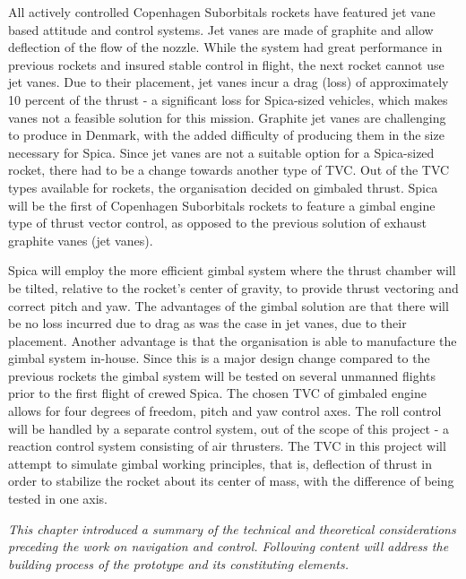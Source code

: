 All actively controlled Copenhagen Suborbitals rockets have featured jet vane based attitude and control systems. Jet vanes are made of graphite and allow deflection of the flow of the nozzle. While the system had great performance in previous rockets and insured stable control in flight, the next rocket cannot use jet vanes.
Due to their placement, jet vanes incur a drag (loss) of approximately 10 percent of the thrust - a significant loss for Spica-sized vehicles, which makes vanes not a feasible solution for this mission.
Graphite jet vanes are challenging to produce in Denmark, with the added difficulty of producing them in the size necessary for Spica.
Since jet vanes are not a suitable option for a Spica-sized rocket, there had to be a change towards another type of TVC. Out of the TVC types available for rockets, the organisation decided on gimbaled thrust.
Spica will be the first of Copenhagen Suborbitals rockets to feature a gimbal engine type of thrust vector control, as opposed to the previous solution of exhaust graphite vanes (jet vanes).

Spica will employ the more efficient gimbal system where the thrust chamber will be tilted, relative to the rocket’s center of gravity, to provide thrust vectoring and correct pitch and yaw. 
The advantages of the gimbal solution are that there will be no loss incurred due to drag as was the case in jet vanes, due to their placement. Another advantage is that the organisation is able to manufacture the gimbal system in-house. 
Since this is a major design change compared to the previous rockets the gimbal system will be tested on several unmanned flights prior to the first flight of crewed Spica.
The chosen TVC of gimbaled engine allows for four degrees of freedom, pitch and yaw control axes.
The roll control will be handled by a separate control system, out of the scope of this project - a reaction control system consisting of air thrusters. 
The TVC in this project will attempt to simulate gimbal working principles, that is, deflection of thrust in order to stabilize the rocket about its center of mass, with the difference of being tested in one axis.

\textit{This chapter introduced a summary of the technical and theoretical considerations preceding the work on navigation and control. Following content will address the building process of the prototype and its constituting elements.}


